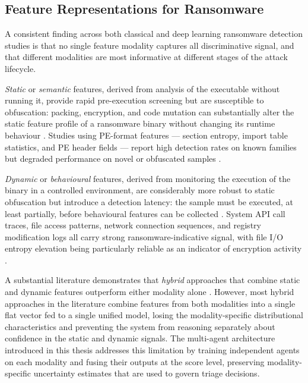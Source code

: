 \subsection{Feature Representations for Ransomware}
\label{sec:lit_features}

A consistent finding across both classical and deep learning ransomware detection studies is
that no single feature modality captures all discriminative signal, and that different
modalities are most informative at different stages of the attack lifecycle.

\emph{Static} or \emph{semantic} features, derived from analysis of the executable without
running it, provide rapid pre-execution screening but are susceptible to obfuscation: packing,
encryption, and code mutation can substantially alter the static feature profile of a
ransomware binary without changing its runtime behaviour \cite{Urooj2024polymorphism,
sikorski2012practical}.
Studies using PE-format features — section entropy, import table statistics, and PE header
fields — report high detection rates on known families but degraded performance on novel or
obfuscated samples \cite{GogineniDV22ForeseerRanSAP}.

\emph{Dynamic} or \emph{behavioural} features, derived from monitoring the execution of the
binary in a controlled environment, are considerably more robust to static obfuscation but
introduce a detection latency: the sample must be executed, at least partially, before
behavioural features can be collected \cite{hirano2022ransap}.
System API call traces, file access patterns, network connection sequences, and registry
modification logs all carry strong ransomware-indicative signal, with file I/O entropy
elevation being particularly reliable as an indicator of encryption activity
\cite{SgandurraMML16, hirano2022ransap}.

A substantial literature demonstrates that \emph{hybrid} approaches that combine static and
dynamic features outperform either modality
alone \cite{Ferdous2024Comp, yumlembam2024comprehensive}.
However, most hybrid approaches in the literature combine features from both modalities into
a single flat vector fed to a single unified model, losing the modality-specific
distributional characteristics and preventing the system from reasoning separately about
confidence in the static and dynamic signals.
The multi-agent architecture introduced in this thesis addresses this limitation by training
independent agents on each modality and fusing their outputs at the score level, preserving
modality-specific uncertainty estimates that are used to govern triage decisions.

